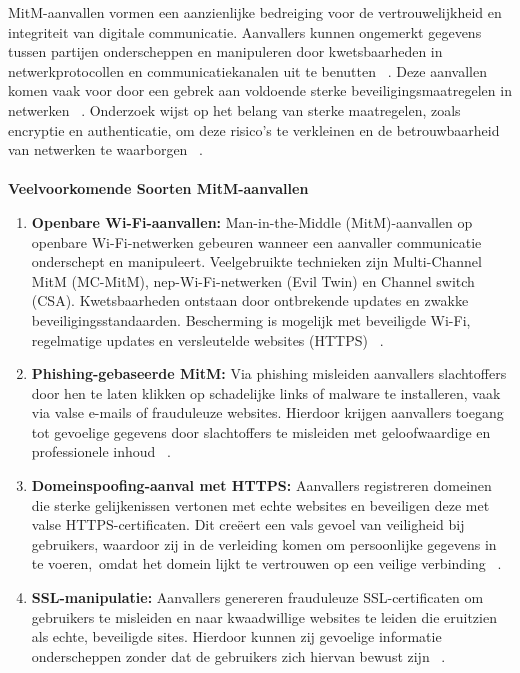 MitM-aanvallen vormen een aanzienlijke bedreiging voor de vertrouwelijkheid en integriteit van digitale communicatie. Aanvallers kunnen ongemerkt gegevens tussen partijen onderscheppen en manipuleren door kwetsbaarheden in netwerkprotocollen en communicatiekanalen uit te benutten 
~\autocite{ELRAWY2023}. Deze aanvallen komen vaak voor door een gebrek aan voldoende sterke beveiligingsmaatregelen in netwerken  ~\autocite{HALGAMUGE2025}. Onderzoek wijst op het belang van sterke maatregelen, zoals encryptie en authenticatie, om deze risico’s te verkleinen en de betrouwbaarheid van netwerken te waarborgen ~\autocite{ALIYU201824}.
\\
\\
\textbf{Veelvoorkomende Soorten MitM-aanvallen}
\begin{enumerate}
  \item \textbf{Openbare Wi-Fi-aanvallen:}  
  Man-in-the-Middle (MitM)-aanvallen op openbare Wi-Fi-netwerken gebeuren wanneer een aanvaller communicatie onderschept en manipuleert. Veelgebruikte technieken zijn Multi-Channel MitM (MC-MitM), nep-Wi-Fi-netwerken (Evil Twin) en Channel switch (CSA). Kwetsbaarheden ontstaan door ontbrekende updates en zwakke beveiligingsstandaarden. Bescherming is mogelijk met beveiligde Wi-Fi, regelmatige updates en versleutelde websites (HTTPS) ~\autocite{THANKAPPAN2022}.
  
  \item \textbf{Phishing-gebaseerde MitM:}  
  Via phishing misleiden aanvallers slachtoffers door hen te laten klikken op schadelijke links of malware te installeren, vaak via valse e-mails of frauduleuze websites. Hierdoor krijgen aanvallers toegang tot gevoelige gegevens door slachtoffers te misleiden met geloofwaardige en professionele inhoud ~\autocite{Nmachi2023}.
  
  \item \textbf{Domeinspoofing-aanval met HTTPS:}  
  Aanvallers registreren domeinen die sterke gelijkenissen vertonen met echte websites en beveiligen deze met valse HTTPS-certificaten. Dit creëert een vals gevoel van veiligheid bij gebruikers, waardoor zij in de verleiding komen om persoonlijke gegevens in te voeren, omdat het domein lijkt te vertrouwen op een veilige verbinding ​~\autocite{gangan2015}.
  
  \item \textbf{SSL-manipulatie:}  
  Aanvallers genereren frauduleuze SSL-certificaten om gebruikers te misleiden en naar kwaadwillige websites te leiden die eruitzien als echte, beveiligde sites. Hierdoor kunnen zij gevoelige informatie onderscheppen zonder dat de gebruikers zich hiervan bewust zijn ~\autocite{gangan2015}.
  

\end{enumerate}
